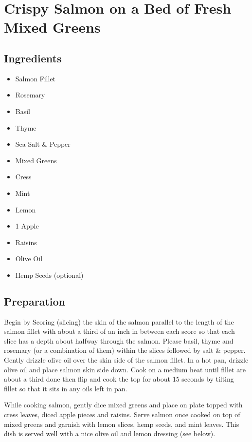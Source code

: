 \thispagestyle{fancy}
\section{Crispy Salmon on a Bed of Fresh Mixed Greens}
\AddToShipoutPicture*{\SalmonSalad}

\subsection*{Ingredients}
\begin{multicols}{3}
	\begin{itemize}
		\item Salmon Fillet
		\item Rosemary
		\item Basil
		\item Thyme
		\item Sea Salt \& Pepper
		\item Mixed Greens
		\item Cress
		\item Mint
		\item Lemon
		\item 1 Apple
		\item Raisins
		\item Olive Oil
		\item Hemp Seeds (optional) 
	\end{itemize}
\end{multicols}

\subsection*{Preparation}

Begin by Scoring (slicing) the skin of the salmon parallel to the length of the salmon fillet with about a third of an inch in between each score so that each slice has a depth about halfway through the salmon. Please basil, thyme and rosemary (or a combination of them) within the slices followed by salt \& pepper. Gently drizzle olive oil over the skin side of the salmon fillet. In a hot pan, drizzle olive oil and place salmon skin side down. Cook on a medium heat until fillet are about a third done then flip and cook the top for about 15 seconds by tilting fillet so that it sits in any oils left in pan.

While cooking salmon, gently dice mixed greens and place on plate topped with cress leaves, diced apple pieces and raisins. Serve salmon once cooked on top of mixed greens and garnish with lemon slices, hemp seeds, and mint leaves. This dish is served well with a nice olive oil and lemon dressing (see below).

